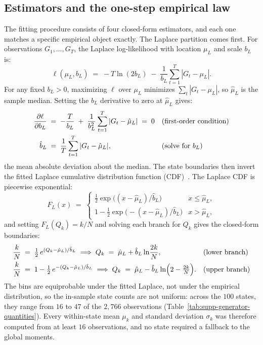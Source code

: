\subsection{Estimators and the one-step empirical law}
\label{sec:supp-gen-estimators}

The fitting procedure consists of four closed-form estimators, and
each one matches a specific empirical object exactly. The Laplace
partition comes first. For observations $G_1, \dots, G_T$, the Laplace
log-likelihood with location $\mu_L$ and scale $b_L$ is:
\begin{equation}
  \ell(\mu_L, b_L) \;=\;
  -T \ln (2 b_L) \;-\; \frac{1}{b_L} \sum_{t=1}^{T} |G_t - \mu_L|.
  \label{eq:supp-laplace-ll}
\end{equation}
For any fixed $b_L > 0$, maximizing $\ell$ over $\mu_L$ minimizes
$\sum_t |G_t - \mu_L|$, so $\hat\mu_L$ is the sample median. Setting
the $b_L$ derivative to zero at $\hat\mu_L$ gives:
\begin{align}
  \frac{\partial \ell}{\partial b_L}
   &\;=\; -\frac{T}{b_L}
     \;+\; \frac{1}{b_L^2} \sum_{t=1}^{T} |G_t - \hat\mu_L|
     \;=\; 0
     && \text{(first-order condition)} \notag \\
  \hat b_L
   &\;=\; \frac{1}{T} \sum_{t=1}^{T} |G_t - \hat\mu_L|,
     && \text{(solve for $b_L$)}
  \label{eq:supp-laplace-mle}
\end{align}
the mean absolute deviation about the median. The state boundaries
then invert the fitted Laplace cumulative distribution function
(CDF)~\cite{kotzKozubowskiPodgorski2001}. The Laplace CDF is
piecewise exponential:
\begin{equation}
  F_L(x) \;=\;
  \begin{cases}
    \tfrac{1}{2} \exp\!\big((x - \hat\mu_L)/\hat b_L\big)
      & x \le \hat\mu_L,\\[4pt]
    1 - \tfrac{1}{2} \exp\!\big(-(x - \hat\mu_L)/\hat b_L\big)
      & x > \hat\mu_L,
  \end{cases}
  \label{eq:supp-laplace-cdf}
\end{equation}
and setting $F_L(Q_k) = k/N$ and solving each branch for $Q_k$ gives
the closed-form boundaries:
\begin{align}
  \frac{k}{N} &\;=\; \tfrac{1}{2}\,
    e^{(Q_k - \hat\mu_L)/\hat b_L}
  \;\Longrightarrow\;
  Q_k \;=\; \hat\mu_L + \hat b_L \ln\!\frac{2k}{N},
    && \text{(lower branch)} \notag \\
  \frac{k}{N} &\;=\; 1 - \tfrac{1}{2}\,
    e^{-(Q_k - \hat\mu_L)/\hat b_L}
  \;\Longrightarrow\;
  Q_k \;=\; \hat\mu_L - \hat b_L
    \ln\!\Big(2 - \tfrac{2k}{N}\Big).
    && \text{(upper branch)}
  \label{eq:supp-quantiles}
\end{align}
The bins are equiprobable under the fitted Laplace, not under the
empirical distribution, so the in-sample state counts are not uniform:
across the $100$ states, they range from $16$ to $47$ of the $2{,}766$
observations (Table~\ref{tab:supp-generator-quantities}). Every within-state mean $\mu_k$ and standard deviation
$\sigma_k$ was therefore computed from at least $16$ observations, and
no state required a fallback to the global moments.

